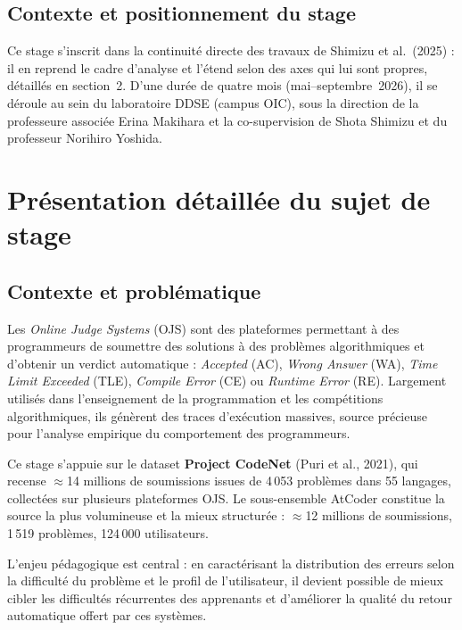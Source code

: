 \documentclass[11pt, a4paper]{article}
\begin{document}
\subsection{Contexte et positionnement du stage}

Ce stage s'inscrit dans la continuité directe des travaux de Shimizu et
al.\ (2025) : il en reprend le cadre d'analyse et l'étend selon des axes qui
lui sont propres, détaillés en section~2. D'une durée de quatre mois
(mai--septembre~2026), il se déroule au sein du laboratoire DDSE (campus OIC),
sous la direction de la professeure associée Erina Makihara et la co-supervision de Shota Shimizu et du professeur Norihiro Yoshida.

\section{Présentation détaillée du sujet de stage}

\subsection{Contexte et problématique}

Les \textit{Online Judge Systems} (OJS) sont des plateformes permettant
à des programmeurs de soumettre des solutions à des problèmes
algorithmiques et d'obtenir un verdict automatique : \textit{Accepted}
(AC), \textit{Wrong Answer} (WA), \textit{Time Limit Exceeded} (TLE),
\textit{Compile Error} (CE) ou \textit{Runtime Error} (RE). Largement
utilisés dans l'enseignement de la programmation et les compétitions
algorithmiques, ils génèrent des traces d'exécution massives, source
précieuse pour l'analyse empirique du comportement des programmeurs.

Ce stage s'appuie sur le dataset \textbf{Project CodeNet} (Puri et al.,
2021), qui recense $\approx$14 millions de soumissions issues de 4\,053
problèmes dans 55 langages, collectées sur plusieurs plateformes OJS.
Le sous-ensemble AtCoder constitue la source la plus volumineuse et la
mieux structurée : $\approx$12 millions de soumissions, 1\,519 problèmes,
124\,000 utilisateurs.

L'enjeu pédagogique est central : en caractérisant la distribution des
erreurs selon la difficulté du problème et le profil de l'utilisateur,
il devient possible de mieux cibler les difficultés récurrentes des
apprenants et d'améliorer la qualité du retour automatique offert par
ces systèmes.
\end{document}
